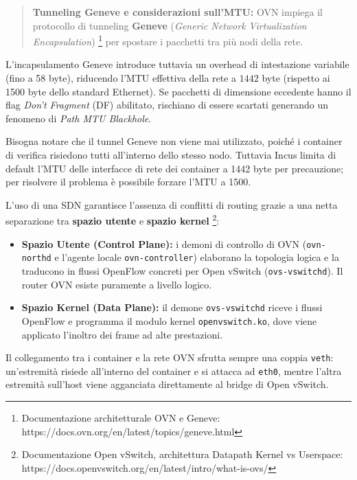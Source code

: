 \begin{quote}
\textbf{Tunneling Geneve e considerazioni sull'MTU:} OVN impiega il
protocollo di tunneling \textbf{Geneve} (\emph{Generic Network
Virtualization Encapsulation}) \footnote{\label{fn:ref_18}Documentazione architetturale
  OVN e Geneve: https://docs.ovn.org/en/latest/topics/geneve.html} per
spostare i pacchetti tra più nodi della rete.
\end{quote}

L'incapsulamento Geneve introduce tuttavia un overhead di intestazione
variabile (fino a 58 byte), riducendo l'MTU effettiva della rete a
\(1442\) byte (rispetto ai 1500 byte dello standard Ethernet). Se
pacchetti di dimensione eccedente hanno il flag \emph{Don't Fragment}
(DF) abilitato, rischiano di essere scartati generando un fenomeno di
\emph{Path MTU Blackhole}.

Bisogna notare che il tunnel Geneve non viene mai utilizzato, poiché i
container di verifica risiedono tutti all'interno dello stesso nodo.
Tuttavia Incus limita di default l'MTU delle interfacce di rete dei
container a 1442 byte per precauzione; per risolvere il problema è
possibile forzare l'MTU a 1500.

L'uso di una SDN garantisce l'assenza di conflitti di routing grazie a
una netta separazione tra \textbf{spazio utente} e \textbf{spazio
kernel} \footnote{\label{fn:ref_19}Documentazione Open vSwitch, architettura Datapath
  Kernel vs Userspace:
  https://docs.openvswitch.org/en/latest/intro/what-is-ovs/}:

\begin{itemize}
\tightlist
\item
  \textbf{Spazio Utente (Control Plane):} i demoni di controllo di OVN
  (\passthrough{\lstinline!ovn-northd!} e l'agente locale
  \passthrough{\lstinline!ovn-controller!}) elaborano la topologia
  logica e la traducono in flussi OpenFlow concreti per Open vSwitch
  (\passthrough{\lstinline!ovs-vswitchd!}). Il router OVN esiste
  puramente a livello logico.
\item
  \textbf{Spazio Kernel (Data Plane):} il demone
  \passthrough{\lstinline!ovs-vswitchd!} riceve i flussi OpenFlow e
  programma il modulo kernel \passthrough{\lstinline!openvswitch.ko!},
  dove viene applicato l'inoltro dei frame ad alte prestazioni.
\end{itemize}

Il collegamento tra i container e la rete OVN sfrutta sempre una coppia
\passthrough{\lstinline!veth!}: un'estremità risiede all'interno del
container e si attacca ad \passthrough{\lstinline!eth0!}, mentre l'altra
estremità sull'host viene agganciata direttamente al bridge di Open
vSwitch.

